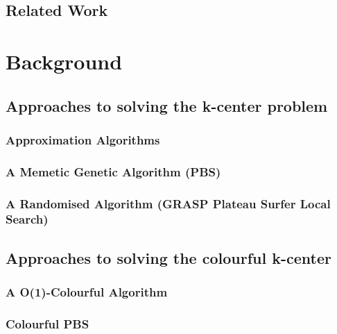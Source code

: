 \documentclass{article}
\begin{document}
    \subsection{Related Work}
    

\newpage
\section{Background}\label{section:background}
    \subsection{Approaches to solving the k-center problem}\label{subsection:approaches_k_center}
    

        \subsubsection{Approximation Algorithms}\label{section:greedy}
        
        
        \subsubsection{A Memetic Genetic Algorithm (PBS)}\label{section:pbs}
        
        
        \subsubsection{A Randomised Algorithm (GRASP Plateau Surfer Local Search)}\label{section:plateau_surfer}
        

    \subsection{Approaches to solving the colourful k-center}\label{subsection:approaches_colourful_k_center}
    

        \subsubsection{A O(1)-Colourful Algorithm}\label{section:constant_colourful_k_center}
        
        
        \newpage
        \subsubsection{Colourful PBS}\label{section:colourful_pbs}
        
\end{document}
